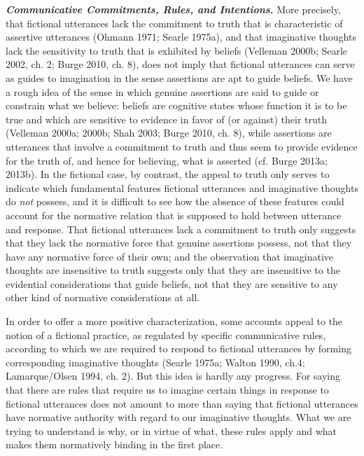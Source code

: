\vspace{.2cm}
\noindent \textbf{\emph{Communicative Commitments, Rules, and Intentions.}} More precisely, that fictional utterances lack the commitment to truth that is characteristic of assertive utterances (Ohmann 1971; Searle 1975a), and that imaginative thoughts lack the sensitivity to truth that is exhibited by beliefs (Velleman 2000b; Searle 2002, ch. 2; Burge 2010, ch. 8), does not imply that fictional utterances can serve as guides to imagination in the sense assertions are apt to guide beliefs. We have a rough idea of the sense in which genuine assertions are said to guide or constrain what we believe: beliefs are cognitive states whose function it is to be true and which are sensitive to evidence in favor of (or against) their truth (Velleman 2000a; 2000b; Shah 2003; Burge 2010, ch. 8), while assertions are utterances that involve a commitment to truth and thus seem to provide evidence for the truth of, and hence for believing, what is asserted (cf. Burge 2013a; 2013b). In the fictional case, by contrast, the appeal to truth only serves to indicate which fundamental features fictional utterances and imaginative thoughts do \emph{not} possess, and it is difficult to see how the absence of these features could account for the normative relation that is supposed to hold between utterance and response. That fictional utterances lack a commitment to truth only suggests that they lack the normative force that genuine assertions possess, not that they have any normative force of their own; and the observation that imaginative thoughts are insensitive to truth suggests only that they are insensitive to the evidential considerations that guide beliefs, not that they are sensitive to any other kind of normative considerations at all.

In order to offer a more positive characterization, some accounts appeal to the notion of a fictional practice, as regulated by specific communicative rules, according to which we are required to respond to fictional utterances by forming corresponding imaginative thoughts (Searle 1975a; Walton 1990, ch.4; Lamarque/Olsen 1994, ch. 2). But this idea is hardly any progress. For saying that there are rules that require us to imagine certain things in response to fictional utterances does not amount to more than saying that fictional utterances have normative authority with regard to our imaginative thoughts. What we are trying to understand is why, or in virtue of what, these rules apply and what makes them normatively binding in the first place.

